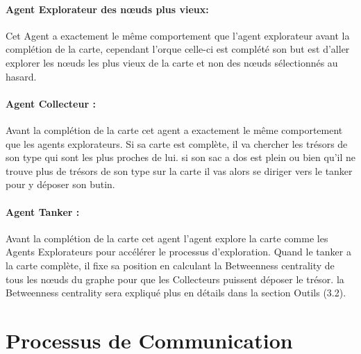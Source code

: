 \documentclass[10pt]{article}
\begin{document}
\paragraph{Agent Explorateur des nœuds plus vieux:}
Cet Agent a exactement le même comportement que l'agent explorateur avant la complétion de la carte, cependant l'orque celle-ci est complété son but est d'aller explorer les nœuds les plus vieux de la carte et non des nœuds sélectionnés au hasard.

\paragraph{Agent Collecteur :} Avant la complétion de la carte cet agent a exactement le même comportement que les agents explorateurs. Si sa carte est complète, il va chercher les trésors de son type qui sont les plus proches de lui. si son sac a dos est plein ou bien qu'il ne trouve plus de trésors de son type sur la carte il vas alors se diriger vers le tanker pour y déposer son butin.

\paragraph{Agent Tanker :} Avant la complétion de la carte cet agent l'agent explore la carte comme les Agents Explorateurs pour accélérer le processus d'exploration. Quand le tanker a la carte complète, il fixe sa position en calculant la Betweenness centrality de tous les nœuds du graphe pour que les Collecteurs puissent déposer le trésor. la Betweenness centrality sera expliqué plus en détails dans la section Outils (3.2).

\section{Processus de Communication}
\end{document}
